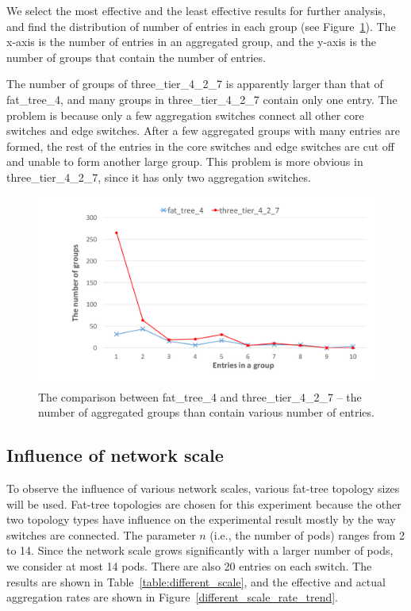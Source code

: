 \documentclass[conference]{IEEEtran}
\begin{document}
We select the most effective and the least effective results for further analysis, and find the distribution of number of entries in each group (see Figure~\ref{different_topo_distribute}). The x-axis is the number of entries in an aggregated group, and the y-axis is the number of groups that contain the number of entries.

The number of groups of three\_tier\_4\_2\_7 is apparently larger than that of fat\_tree\_4, and many groups in three\_tier\_4\_2\_7 contain only one entry. The problem is because only a few aggregation switches connect all other core switches and edge switches. After a few aggregated groups with many entries are formed, the rest of the entries in the core switches and edge switches are cut off and unable to form another large group. This problem is more obvious in three\_tier\_4\_2\_7, since it has only two aggregation switches. 

\begin{figure}[ht]
\centering 
\includegraphics[width=1\linewidth]{figures/exp_topotype_distribute.pdf}
\caption{The comparison between fat\_tree\_4 and three\_tier\_4\_2\_7 -- the number of aggregated groups than contain various number of entries.}
\label{different_topo_distribute}
\end{figure}

\subsection{Influence of network scale}
To observe the influence of various network scales, various fat-tree topology sizes will be used. Fat-tree topologies are chosen for this experiment because the other two topology types have influence on the experimental result mostly by the way switches are connected. The parameter $n$ (i.e., the number of pods) ranges from 2 to 14. Since the network scale grows significantly with a larger number of pods, we consider at most 14 pods. There are also 20 entries on each switch. The results are shown in Table~\ref{table:different_scale}, and the effective and actual aggregation rates are shown in Figure~\ref{different_scale_rate_trend}.
\end{document}
